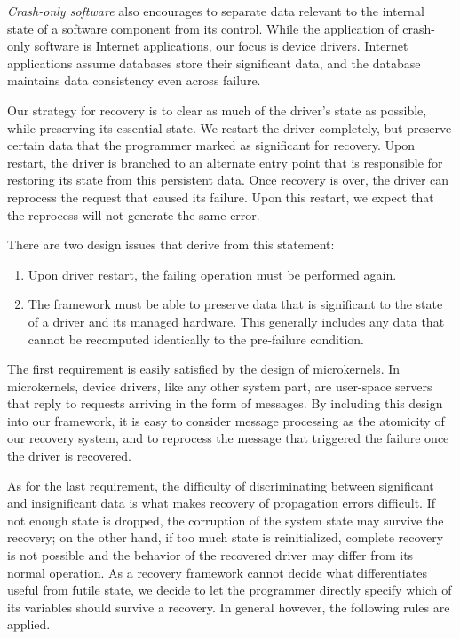 \documentclass{report}
\begin{document}
{\it Crash-only software}\cite{candea03crash-only} also encourages to separate data relevant to the internal state of a software component from its control.  While the application of crash-only software is Internet applications, our focus is device drivers.  Internet applications assume databases store their significant data, and the database maintains data consistency even across failure.

Our strategy for recovery is to clear as much of the driver's state as possible, while preserving its essential state. We restart the driver completely, but preserve certain data that the programmer marked as significant for recovery.  Upon restart, the driver is branched to an alternate entry point that is responsible for restoring its state from this persistent data. Once recovery is over, the driver can reprocess the request that caused its failure. Upon this restart, we expect that the reprocess will not generate the same error.

There are two design issues that derive from this statement:
\begin{enumerate}
\item Upon driver restart, the failing operation must be performed again.
\item The framework must be able to preserve data that is significant to the state of a driver and its managed hardware. This generally includes any data that cannot be recomputed identically to the pre-failure condition.
\end{enumerate}

The first requirement is easily satisfied by the design of microkernels.  In microkernels, device drivers, like any other system part, are user-space servers that reply to requests arriving in the form of messages. By including this design into our framework, it is easy to consider message processing as the atomicity of our recovery system, and to reprocess the message that triggered the failure once the driver is recovered.

As for the last requirement, the difficulty of discriminating between significant and insignificant data is what makes recovery of propagation errors difficult. If not enough state is dropped, the corruption of the system state may survive the recovery; on the other hand, if too much state is reinitialized, complete recovery is not possible and the behavior of the recovered driver may differ from its normal operation. As a recovery framework cannot decide what differentiates useful from futile state, we decide to let the programmer directly specify which of its variables should survive a recovery. In general however, the following rules are applied.
\end{document}
